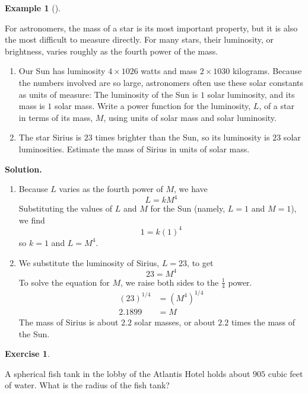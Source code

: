 \documentclass[10pt,]{book}
\theoremstyle{plain}
\theoremstyle{definition}
\theoremstyle{definition}
\theoremstyle{definition}
\newtheorem{example}[theorem]{Example}
\theoremstyle{definition}
\theoremstyle{definition}
\newtheorem{exercise}[theorem]{Exercise}
\numberwithin{equation}{section}
\newcommand{\amp}{ & }
\begin{document}
\begin{example}[]\label{example-star-luminosity}

        For astronomers, the mass of a star is its most important property, but it is also the most difficult to measure directly. For many stars, their luminosity, or brightness, varies roughly as the fourth power of the mass.
\leavevmode%
\begin{enumerate}[label=*\alph**]
\item\hypertarget{li-493}{}Our Sun has luminosity \(4 \times 1026\) watts and mass \(2 \times 1030\) kilograms. Because the numbers involved are so large, astronomers often use these solar constants as units of measure: The luminosity of the Sun is \(1\) solar luminosity, and its mass is \(1\) solar mass. Write a power function for the luminosity, \(L\), of a star in terms of its mass, \(M\), using units of solar mass and solar luminosity.\item\hypertarget{li-494}{}The star Sirius is \(23\) times brighter than the Sun, so its luminosity is \(23\) solar luminosities. Estimate the mass of Sirius in units of solar mass.\end{enumerate}
\par\medskip\noindent%
\textbf{Solution.}\quad \leavevmode%
\begin{enumerate}[label=*\alph**]
\item\hypertarget{li-495}{}Because \(L\) varies as the fourth power of \(M\), we have
        \begin{equation*}L = kM^4\end{equation*}
        Substituting the values of \(L\) and \(M\) for the Sun (namely, \(L = 1\) and \(M = 1\)), we find
        \begin{equation*}1 = k(1)^4\end{equation*}
        so \(k = 1\) and \(L = M^4\).\item\hypertarget{li-496}{}We substitute the luminosity of Sirius, \(L = 23\), to get
        \begin{equation*}23 = M^4\end{equation*}
        To solve the equation for \(M\), we raise both sides to the \(\frac{1}{4}\) power.
        \begin{align*}
        (23)^{1/4} \amp = \left(M^4\right)^{1/4} \\
        2.1899 \amp = M
        \end{align*}
        The mass of Sirius is about \(2.2\) solar masses, or about \(2.2\) times the mass of the Sun.\end{enumerate}
\end{example}
\begin{exercise}\label{exercise-spherical-tank}

    A spherical fish tank in the lobby of the Atlantis Hotel holds about \(905\) cubic feet of water. What is the radius of the fish tank?
\end{exercise}
\typeout{************************************************}
\typeout{************************************************}
\end{document}
